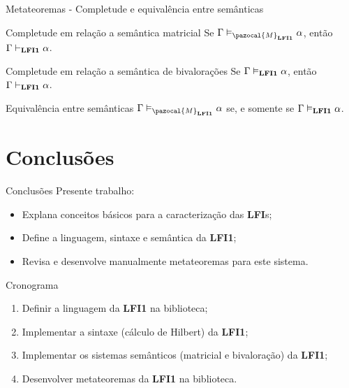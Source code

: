 \documentclass[table]{beamer}
\newcommand{\lfium}{{\normalfont\textbf{LFI1}}}
\newcommand{\lfis}{{\normalfont\textbf{LFI}s}}
\newcommand{\conmat}{\vDash_{\pazocal{M}_{\lfium{}}}}
\newcommand{\conval}{\vDash_{\lfium{}}}
\newcommand{\conhil}{\vdash_{\lfium{}}}
\begin{document}
    \begin{frame}{Metateoremas {-} Completude e equivalência entre semânticas}
        \begin{block}{Completude em relação a semântica matricial}
            Se $\Gamma \conmat \alpha$, então $\Gamma \conhil \alpha$.
        \end{block}

        \begin{block}{Completude em relação a semântica de bivalorações}
           Se $\Gamma \conval \alpha$, então $\Gamma \conhil \alpha$.
        \end{block}

        \begin{block}{Equivalência entre semânticas}
            $\Gamma \conmat \alpha$ se, e somente se $\Gamma \conval \alpha$.
        \end{block}
    \end{frame}
        

\section[]{Conclusões}
    
    \begin{frame}{Conclusões}
        Presente trabalho:
        \begin{itemize}
            \item Explana conceitos básicos para a caracterização das \lfis{};
            \item Define a linguagem, sintaxe e semântica da \lfium{};
            \item Revisa e desenvolve manualmente metateoremas para este sistema.
        \end{itemize}
    \end{frame}

    \begin{frame}{Cronograma}
        \begin{enumerate}
            \item Definir a linguagem da \lfium{} na biblioteca;
            \item Implementar a sintaxe (cálculo de Hilbert) da \lfium{};
            \item Implementar os sistemas semânticos (matricial e bivaloração) da \lfium{};
            \item Desenvolver metateoremas da \lfium{} na biblioteca.
        \end{enumerate}
    \end{frame}
\end{document}
